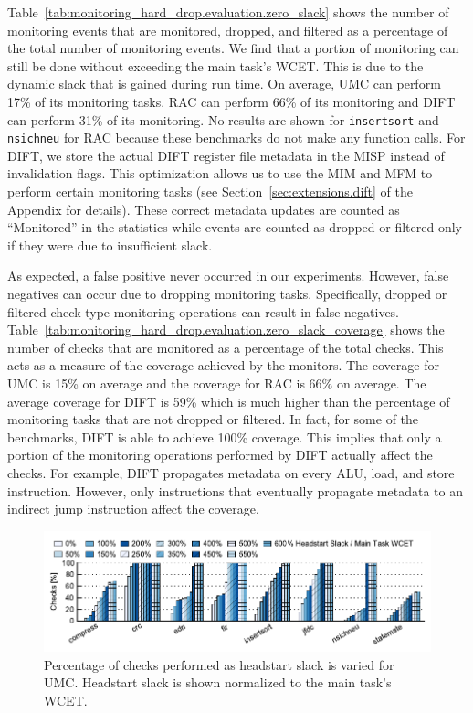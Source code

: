 Table~\ref{tab:monitoring_hard_drop.evaluation.zero_slack} shows the number of
monitoring events that are monitored, dropped, and filtered as a percentage of
the total number of monitoring events. We find that a portion of monitoring can
still be done without exceeding the main task's WCET. This is due to the
dynamic slack that is gained during run time. On average, UMC can perform 17\%
of its monitoring tasks. RAC can perform 66\% of its monitoring and DIFT can
perform 31\% of its monitoring.  No results are shown for {\tt insertsort} and
{\tt nsichneu} for RAC because these benchmarks do not make any function calls.
For DIFT, we store the actual DIFT register file metadata in the MISP instead
of invalidation flags. This optimization allows us to use the MIM and MFM to
perform certain monitoring tasks (see Section~\ref{sec:extensions.dift} of the
Appendix for details). These correct metadata updates are counted as
``Monitored'' in the statistics while events are counted as dropped or filtered
only if they were due to insufficient slack.

As expected, a false positive never occurred in our experiments. However, false
negatives can occur due to dropping monitoring tasks. Specifically, dropped or
filtered check-type monitoring operations can result in false negatives.
Table~\ref{tab:monitoring_hard_drop.evaluation.zero_slack_coverage} shows the
number of checks that are monitored as a percentage of the total checks. This
acts as a measure of the coverage achieved by the monitors. The coverage for
UMC is 15\% on average and the coverage for RAC is 66\% on average. The average
coverage for DIFT is 59\% which is much higher than the percentage of
monitoring tasks that are not dropped or filtered. In fact, for some of the
benchmarks, DIFT is able to achieve 100\% coverage. This implies that only a
portion of the monitoring operations performed by DIFT actually affect the
checks.  For example, DIFT propagates metadata on every ALU, load, and store
instruction. However, only instructions that eventually propagate metadata to
an indirect jump instruction affect the coverage.

\begin{figure}
  \begin{center}
    \includegraphics{monitoring_hard_drop/data/umc_sweep.pdf}
    \caption{Percentage of checks performed as headstart slack is varied for
    UMC. Headstart slack is shown normalized to the main task's WCET.}
    \label{fig:monitoring_hard_drop.evaluation.umc_sweep}
  \end{center}
\end{figure}

